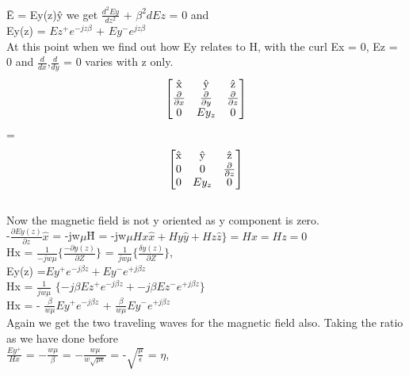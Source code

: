 			\={E} = Ey(z)\^{y} we get $\frac{d^2Ey}{dz^2}$ + $\beta^2dEz$ = 0 and  \\
			
			Ey(z) = $Ez^+e^{-jz\beta}$ + $Ey^-e^{jz\beta}$
			\\
			
			At this point when we find out how Ey relates to H, with the curl Ex = 0, Ez = 0 and $\frac{d}{dx}$,$\frac{d}{dy}$ = 0 varies with z only.\\
			
			\[
			\begin{bmatrix}
				$\^{x}$ & $\^{y}$ & $\^{z}$\\
				\frac{\partial}{\partial x} & \frac{\partial}{\partial y} & \frac{\partial}{\partial z}\\
				0 & Ey_{z} & 0
			\end{bmatrix} \] = 
			\[
			\begin{bmatrix}
				$\^{x}$ & $\^{y}$ & $\^{z}$\\
				0 & 0 & \frac{\partial}{\partial z}\\
				0 & Ey_{z} & 0
			\end{bmatrix}
			\]
			\\
			
			Now the magnetic field is not y oriented as y component is zero.\\
			
			-$\frac{\partial Ey(z)}{\partial z}\hat{x}$ = -jw$\mu$\= {H} = -jw$\mu Hx\hat{x} + Hy\hat{y} + Hz\hat{z}\} = Hx = Hz = 0$
		\\
		
		Hx = $\frac{1}{-jw\mu}$$\{\frac{-\partial y(z)}{\partial Z}\}$ =  $\frac{1}{jw\mu}$$\{\frac{\delta y(z)}{\partial Z}\}$, \\
		
		Ey(z) =$ Ey^+ e^{-j\beta z} + Ey^- e^{+j\beta z}$\\
		
		Hx =  $\frac{1}{jw\mu}$ $\{-j\beta Ez^+e^{-j\beta z} + -j\beta Ez^-e^{+j\beta z} \}$
		\\
		
		Hx = - $\frac{\beta}{w\mu} Ey^+e^{-j\beta z}
		$ + $\frac{\beta}{w\mu}Ey^-e^{+j\beta z}$
		\\
		
		Again we get the two traveling waves for the magnetic field also. Taking the ratio as we have done before 
		\\
		$\frac{Ey^+}{Hx}$ = $-\frac{w\mu}{\beta}$ = $-\frac{w\mu}{w\sqrt{\mu \epsilon}}$ = -$\sqrt{\frac{\mu}{\epsilon}}$ = $\eta$,\\
	
